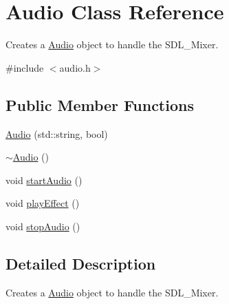 \hypertarget{class_audio}{\section{Audio Class Reference}
\label{class_audio}
}


Creates a \hyperlink{class_audio}{Audio} object to handle the S\+D\+L\+\_\+\+Mixer.  




{\ttfamily \#include $<$audio.\+h$>$}

\subsection*{Public Member Functions}
\begin{DoxyCompactItemize}
\item 
\hyperlink{class_audio_ae1900ee0e5254fe0c96e0b423ea02777}{Audio} (std\+::string, bool)
\item 
\hyperlink{class_audio_ae8f54deecb5f48511aaab469e80294d6}{$\sim$\+Audio} ()
\item 
void \hyperlink{class_audio_a15f1ea89039f6dbbb2260bb34f9dabdd}{start\+Audio} ()
\item 
void \hyperlink{class_audio_aea41cc6feaed4b1ab5957ea499509f55}{play\+Effect} ()
\item 
void \hyperlink{class_audio_a5d73ae24c80b37df5f167016de9c9296}{stop\+Audio} ()
\end{DoxyCompactItemize}


\subsection{Detailed Description}
Creates a \hyperlink{class_audio}{Audio} object to handle the S\+D\+L\+\_\+\+Mixer. 

